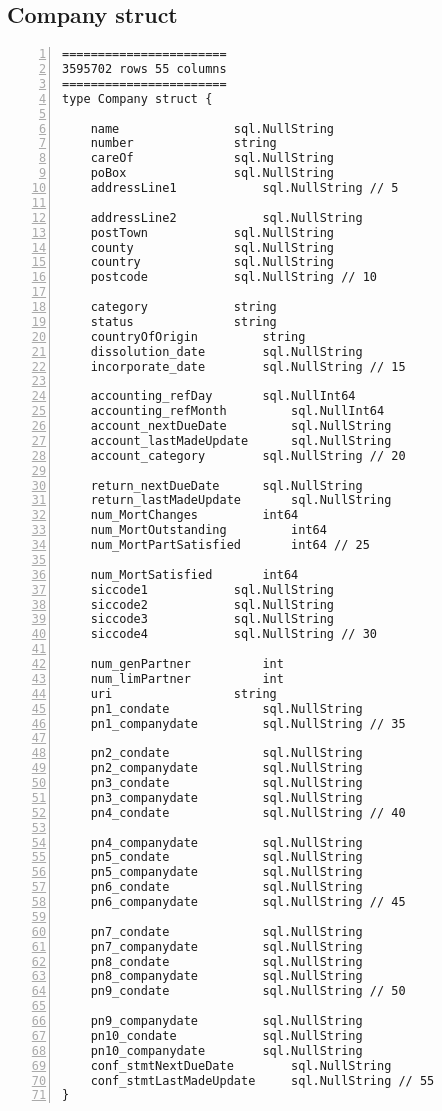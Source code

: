 \subsection{Company struct}

\lstset{basicstyle=\ttfamily\tiny}  
\begin{lstlisting}[breaklines, frame=single, numbers=left, caption={Source code for Company struct. (company.go)}, label=commandline-02]
=======================
3595702 rows 55 columns 
=======================
type Company struct {

	name 				sql.NullString
	number 				string 
	careOf 				sql.NullString 
	poBox 				sql.NullString  
	addressLine1 			sql.NullString // 5
	
	addressLine2 			sql.NullString  
	postTown 			sql.NullString  
	county 				sql.NullString  
	country 			sql.NullString  
	postcode 			sql.NullString // 10
	
	category 			string 
	status 				string 
	countryOfOrigin 		string 
	dissolution_date 		sql.NullString
	incorporate_date 		sql.NullString // 15
	
	accounting_refDay 		sql.NullInt64
	accounting_refMonth 		sql.NullInt64
	account_nextDueDate 		sql.NullString
	account_lastMadeUpdate 		sql.NullString 
	account_category 		sql.NullString // 20
	
	return_nextDueDate 		sql.NullString
	return_lastMadeUpdate 		sql.NullString 
	num_MortChanges 		int64 
	num_MortOutstanding 		int64
	num_MortPartSatisfied 		int64 // 25
	
	num_MortSatisfied 		int64
	siccode1 			sql.NullString 
	siccode2 			sql.NullString
	siccode3 			sql.NullString
	siccode4 			sql.NullString // 30
	
	num_genPartner 			int
	num_limPartner 			int
	uri 				string 
	pn1_condate 			sql.NullString 
	pn1_companydate 		sql.NullString // 35
	
	pn2_condate 			sql.NullString 
	pn2_companydate 		sql.NullString
	pn3_condate 			sql.NullString 
	pn3_companydate 		sql.NullString
	pn4_condate 			sql.NullString // 40
	
	pn4_companydate 		sql.NullString
	pn5_condate 			sql.NullString 
	pn5_companydate 		sql.NullString
	pn6_condate 			sql.NullString 
	pn6_companydate 		sql.NullString // 45
	
	pn7_condate 			sql.NullString 
	pn7_companydate 		sql.NullString
	pn8_condate 			sql.NullString 
	pn8_companydate 		sql.NullString
	pn9_condate 			sql.NullString // 50
	
	pn9_companydate 		sql.NullString
	pn10_condate 			sql.NullString 
	pn10_companydate 		sql.NullString
	conf_stmtNextDueDate 		sql.NullString 
	conf_stmtLastMadeUpdate 	sql.NullString // 55
}

\end{lstlisting}

